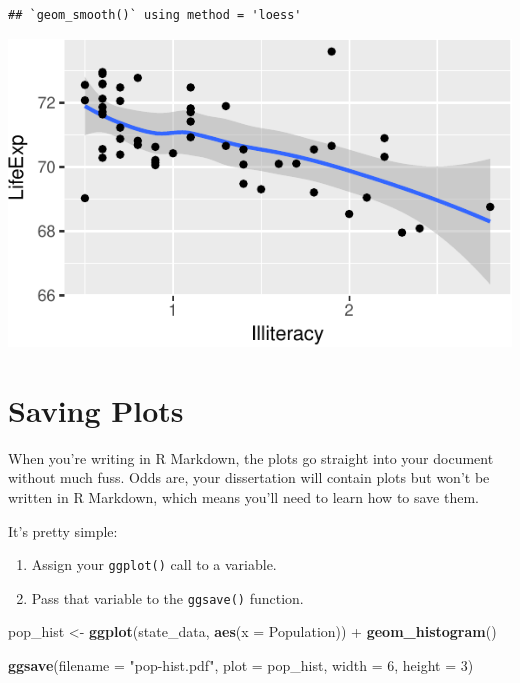 \documentclass[12pt,oneside,openany]{book}
\newenvironment{Shaded}{\begin{snugshade}}{\end{snugshade}}
\newcommand{\KeywordTok}[1]{\textcolor[rgb]{0.13,0.29,0.53}{\textbf{{#1}}}}
\newcommand{\DataTypeTok}[1]{\textcolor[rgb]{0.13,0.29,0.53}{{#1}}}
\newcommand{\DecValTok}[1]{\textcolor[rgb]{0.00,0.00,0.81}{{#1}}}
\newcommand{\StringTok}[1]{\textcolor[rgb]{0.31,0.60,0.02}{{#1}}}
\newcommand{\NormalTok}[1]{{#1}}
\providecommand{\tightlist}{%
  \setlength{\itemsep}{0pt}\setlength{\parskip}{0pt}}
\begin{document}
\begin{verbatim}
## `geom_smooth()` using method = 'loess'
\end{verbatim}

\includegraphics{pdaps_files/figure-latex/combine-1.pdf}

\section{Saving Plots}\label{saving-plots}

When you're writing in R Markdown, the plots go straight into your
document without much fuss. Odds are, your dissertation will contain
plots but won't be written in R Markdown, which means you'll need to
learn how to save them.

It's pretty simple:

\begin{enumerate}
\def\labelenumi{\arabic{enumi}.}
\tightlist
\item
  Assign your \texttt{ggplot()} call to a variable.
\item
  Pass that variable to the \texttt{ggsave()} function.
\end{enumerate}

\begin{Shaded}
\begin{Highlighting}[]
\NormalTok{pop_hist <-}\StringTok{ }\KeywordTok{ggplot}\NormalTok{(state_data, }\KeywordTok{aes}\NormalTok{(}\DataTypeTok{x =} \NormalTok{Population)) +}
\StringTok{  }\KeywordTok{geom_histogram}\NormalTok{()}

\KeywordTok{ggsave}\NormalTok{(}\DataTypeTok{filename =} \StringTok{"pop-hist.pdf"}\NormalTok{,}
       \DataTypeTok{plot =} \NormalTok{pop_hist,}
       \DataTypeTok{width =} \DecValTok{6}\NormalTok{,}
       \DataTypeTok{height =} \DecValTok{3}\NormalTok{)}
\end{Highlighting}
\end{Shaded}
\end{document}
